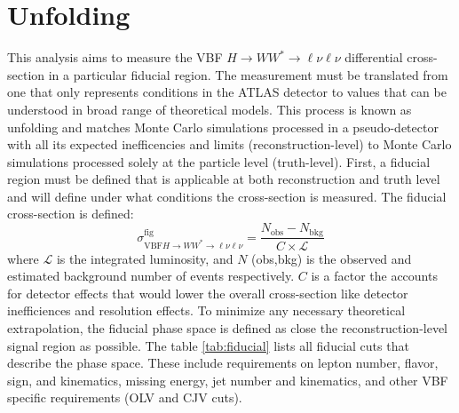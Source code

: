 \section{Unfolding}
This analysis aims to measure the VBF $H\rightarrow WW^*\rightarrow\ell\nu\ell\nu$ differential cross-section in a particular fiducial region. The measurement must be translated from one that only represents conditions in the ATLAS detector to values that can be understood in broad range of theoretical models. This process is known as unfolding and matches Monte Carlo simulations processed in a pseudo-detector with all its expected inefficencies and limits (reconstruction-level) to Monte Carlo simulations processed solely at the particle level (truth-level). First, a fiducial region must be defined that is applicable at both reconstruction and truth level and will define under what conditions the cross-section is measured. The fiducial cross-section is defined:
\begin{equation}
\sigma_{\text{VBF}H\rightarrow WW^*\rightarrow\ell\nu\ell\nu}^{\text{fig}} = \frac{N_{\text{obs}}-N_{\text{bkg}}}{C\times\mathcal{L}}
\end{equation} 
where $\mathcal{L}$ is the integrated luminosity, and $N$ (obs,bkg) is the observed and estimated background number of events respectively. $C$ is a factor the accounts for detector effects that would lower the overall cross-section like detector inefficiences and resolution effects. To minimize any necessary theoretical extrapolation, the fiducial phase space is defined as close the reconstruction-level signal region as possible. The table \ref{tab:fiducial} lists all fiducial cuts that describe the phase space. These include requirements on lepton number, flavor, sign, and kinematics, missing energy, jet number and kinematics, and other VBF specific requirements (OLV and CJV cuts). 
